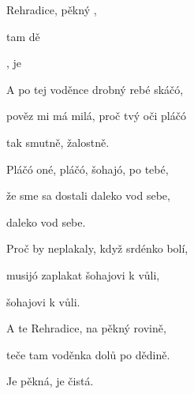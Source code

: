 

\zs
{} Rehradice,  pěkný ,

 tam    dě

, je 
\ks

\zs
A po tej voděnce drobný rebé skáčó,

pověz mi má milá, proč tvý oči pláčó

tak smutně, žalostně.
\ks

\zs
Pláčó oné, pláčó, šohajó, po tebé,

že sme sa dostali daleko vod sebe,

daleko vod sebe.
\ks

\zs
Proč by neplakaly, když srdénko bolí,

musijó zaplakat šohajovi k vůli,

šohajovi k vůli.
\ks

\zs
A te Rehradice, na pěkný rovině,

teče tam voděnka dolů po dědině.

Je pěkná, je čistá.
\ks

\kp























